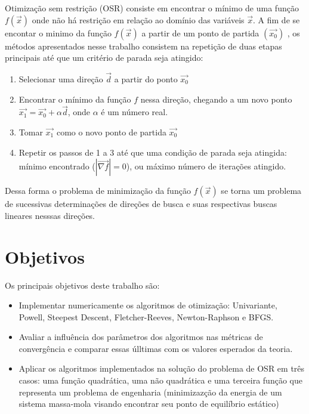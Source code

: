 \documentclass[10pt, a4paper]{article}
\begin{document}
Otimiza\c c\~ao sem restri\c c\~ao (OSR) consiste em encontrar o m\'inimo de uma fun\c c\~ao $f(\vec{x})$ onde n\~ao h\'a restri\c c\~ao em rela\c c\~ao ao dom\'inio das vari\'aveis $\vec{x}$. A fim de se encontar o minimo da fun\c c\~ao $f(\vec{x})$ a partir de um ponto de partida $(\vec{x_{0}})$ , os m\'etodos apresentados nesse trabalho consistem na repeti\c c\~ao de duas etapas principais at\'e que um crit\'erio de parada seja atingido:
\begin{enumerate}
      \item Selecionar uma dire\c c\~ao $\vec{d}$ a partir do ponto $\vec{x_{0}}$
      \item Encontrar o m\'inimo da fun\c c\~ao $f$ nessa dire\c c\~ao, chegando a um novo ponto $\vec{x_{1}} = \vec{x_{0}} + \alpha\vec{d}$, onde $\alpha$ \'e um n\'umero real.
      \item Tomar $\vec{x_{1}}$ como o novo ponto de partida $\vec{x_{0}}$
      \item Repetir os passos de 1 a 3 at\'e que uma condi\c c\~ao de parada seja atingida: m\'inimo encontrado ($|\vec{\nabla f}|=0$), ou m\'aximo n\'umero de itera\c c\~oes atingido.
\end{enumerate}

Dessa forma o problema de minimiza\c c\~ao da fun\c c\~ao $f(\vec{x})$ se torna um problema de sucessivas determina\c c\~oes de dire\c c\~oes de busca e suas respectivas buscas lineares nesssas dire\c c\~oes.

\section{Objetivos}

Os principais objetivos deste trabalho s\~ao:
\begin{itemize}
      \item Implementar numericamente os algoritmos de otimiza\c c\~ao: Univariante, Powell, Steepest Descent, Fletcher-Reeves, Newton-Raphson e BFGS.
      \item Avaliar a influ\^encia dos par\^ametros dos algoritmos nas m\'etricas de converg\^encia e comparar essas \'ulltimas com os valores esperados da teoria.
      \item Aplicar os algoritmos implementados na solu\c c\~ao do problema de OSR em tr\^es casos: uma fun\c c\~ao quadr\'atica, uma n\~ao quadr\'atica e uma terceira fun\c c\~ao que representa um problema de engenharia (minimizaz\c c\~ao da energia de um sistema massa-mola visando encontrar seu ponto de equil\'ibrio est\'atico)
\end{itemize}
\end{document}
